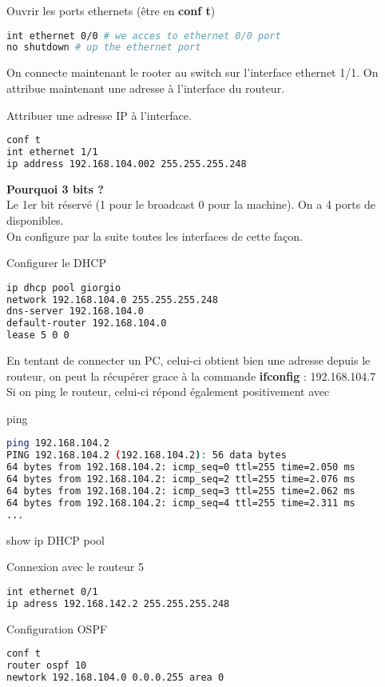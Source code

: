 \documentclass[10pt,a4paper]{article}
\begin{document}
\noindent Ouvrir les ports ethernets (être en \textbf{conf t})
\begin{lstlisting}[language=bash]
int ethernet 0/0 # we acces to ethernet 0/0 port
no shutdown # up the ethernet port
\end{lstlisting}

On connecte maintenant le rooter au switch sur l'interface ethernet 1/1. On attribue maintenant une adresse à l'interface du routeur.

\noindent Attribuer une adresse IP à l'interface.
\begin{lstlisting}[language=bash]
conf t
int ethernet 1/1
ip address 192.168.104.002 255.255.255.248
\end{lstlisting}
\textbf{Pourquoi 3 bits ?}\\
Le 1er bit réservé (1 pour le broadcast 0 pour la machine). On a 4 ports de disponibles.\\
On configure par la suite toutes les interfaces de cette façon.

\noindent Configurer le DHCP
\begin{lstlisting}[language=bash]
ip dhcp pool giorgio
network 192.168.104.0 255.255.255.248
dns-server 192.168.104.0
default-router 192.168.104.0
lease 5 0 0
\end{lstlisting}

En tentant de connecter un PC, celui-ci obtient bien une adresse depuis le routeur, on peut la récupérer grace à la commande \textbf{ifconfig} : 192.168.104.7 \\
Si on ping le routeur, celui-ci répond également positivement avec 

\noindent ping
\begin{lstlisting}[language=bash]
ping 192.168.104.2
PING 192.168.104.2 (192.168.104.2): 56 data bytes
64 bytes from 192.168.104.2: icmp_seq=0 ttl=255 time=2.050 ms
64 bytes from 192.168.104.2: icmp_seq=2 ttl=255 time=2.076 ms
64 bytes from 192.168.104.2: icmp_seq=3 ttl=255 time=2.062 ms
64 bytes from 192.168.104.2: icmp_seq=4 ttl=255 time=2.311 ms
...
\end{lstlisting}
show ip DHCP pool

\noindent Connexion avec le routeur 5
\begin{lstlisting}[language=bash]
int ethernet 0/1
ip adress 192.168.142.2 255.255.255.248
\end{lstlisting}

\noindent Configuration OSPF
\begin{lstlisting}[language=bash]
conf t
router ospf 10
newtork 192.168.104.0 0.0.0.255 area 0
\end{lstlisting}
\end{document}
